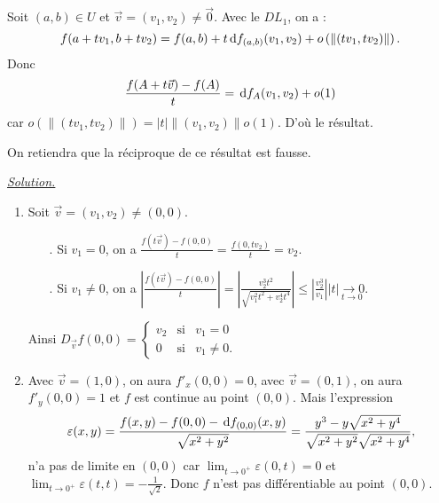 \documentclass[class=report,crop=false]{standalone}
\begin{document}
\vskip4mm

Soit $(a,b)\in U$ et $\vec{v}=(v_1,v_2)\neq \vec{0}$. Avec le $DL_1$, on a :
$$f(a+tv_1,b+tv_2)=f(a,b)+t\,\mathrm{d} f_{(a,b)}(v_1,v_2)+o\left(\|(tv_1,tv_2)\|\right).$$
Donc
$$\frac{f(A+t\vec{v})-f(A)}{t}=\,\mathrm{d} f_{A}(v_1,v_2)+o(1)$$
car $o\left(\|(tv_1,tv_2)\|\right)=|t|\|(v_1,v_2)\|o(1)$. D'o\`u le résultat.

\vskip6mm

\noindent On retiendra que la réciproque de ce résultat est fausse.

\vskip6mm


\vskip4mm

\noindent \underline{\it Solution.}
\begin{enumerate}
\item Soit $\vec{v}=(v_1,v_2)\neq (0,0)$.
\begin{enumerate}
\item[.] Si $v_1=0$, on a $\displaystyle \frac{f(t\vec{v})-f(0,0)}{t}=\frac{f(0,tv_2)}{t}=v_2$.
\item[.] Si $v_1\neq 0$, on a $\displaystyle \left\vert \frac{f(t\vec{v})-f(0,0)}{t}\right\vert= \left\vert \frac{v_2^3t^2}{\sqrt{v_1^2t^2+v_2^4t^4}}\right\vert \leq \left\vert \frac{v_2^3}{v_1}\right\vert |t|\underset{t\to 0}{\longrightarrow 0}$.
\end{enumerate}
Ainsi $\displaystyle D_{\vec{v}}f(0,0)=\left\{\begin{array}{ccc}v_2&\mbox{si}&v_1=0\\ 0&\mbox{si}&v_1\neq 0. \end{array}\right.$
\item Avec $\vec{v}=(1,0)$, on aura $f'_x(0,0)=0$, avec $\vec{v}=(0,1)$, on aura $f'_y(0,0)=1$ et $f$ est continue au point $(0,0)$. Mais l'expression
$$\varepsilon (x,y)=\frac{f(x,y)-f(0,0)-\,\mathrm{d} f_{(0,0)}(x,y)}{\sqrt{x^2+y^2}}=\frac{y^3-y\sqrt{x^2+y^4}}{\sqrt{x^2+y^2}\sqrt{x^2+y^4}},$$
n'a pas de limite en $(0,0)$ car $\displaystyle \lim _{t\to 0^+}\varepsilon (0,t)=0$ et $\displaystyle \lim _{t\to 0^+}\varepsilon (t,t)=-\frac{1}{\sqrt{2}}$. Donc $f$ n'est pas différentiable au point $(0,0)$.
\end{enumerate}
\end{document}
